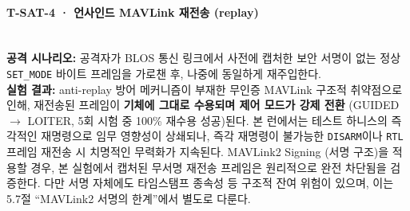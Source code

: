 
\paragraph{\textbf{T-SAT-4 · 언사인드 MAVLink 재전송 (replay)}} ~\\
\textbf{공격 시나리오:} 공격자가 BLOS 통신 링크에서 사전에 캡처한 보안 서명이 없는 정상 \texttt{SET\_MODE} 바이트 프레임을 가로챈 후, 나중에 동일하게 재주입한다.\\
\textbf{실험 결과:} anti-replay 방어 메커니즘이 부재한 무인증 MAVLink 구조적 취약점으로 인해, 재전송된 프레임이 \textbf{기체에 그대로 수용되며 제어 모드가 강제 전환} (GUIDED $\to$ LOITER, 5회 시험 중 100\% 재수용 성공)된다. 본 런에서는 테스트 하니스의 즉각적인 재명령으로 임무 영향성이 상쇄되나, 즉각 재명령이 불가능한 \texttt{DISARM}이나 \texttt{RTL} 프레임 재전송 시 치명적인 무력화가 지속된다. MAVLink2 Signing (서명 구조)을 적용할 경우, 본 실험에서 캡처된 무서명 재전송 프레임은 원리적으로 완전 차단됨을 검증한다. 다만 서명 자체에도 타임스탬프 종속성 등 구조적 잔여 위험이 있으며, 이는 5.7절 ``MAVLink2 서명의 한계''에서 별도로 다룬다.\\


